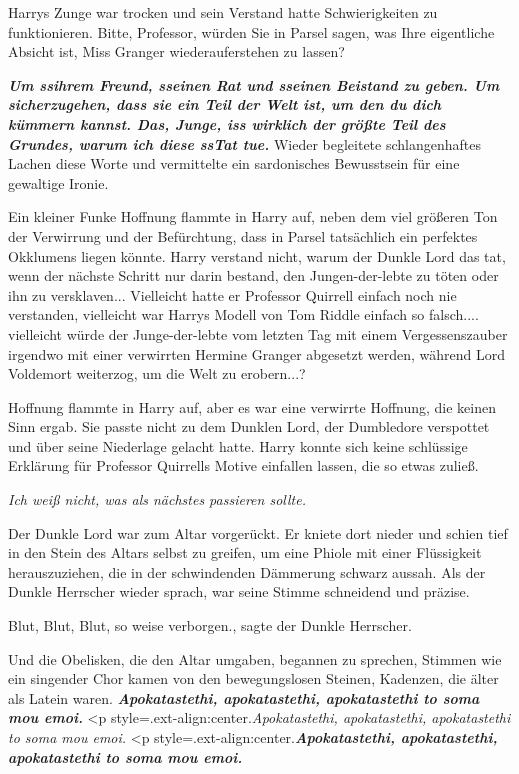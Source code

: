 Harrys Zunge war trocken und sein Verstand hatte Schwierigkeiten zu
funktionieren. \glqq{}Bitte, Professor, würden Sie in Parsel sagen, was Ihre
eigentliche Absicht ist, Miss Granger wiederauferstehen zu lassen?\grqq{}

\glqq{}\textbf{\emph{Um ssihrem Freund, sseinen Rat und sseinen Beistand zu
geben. Um sicherzugehen, dass sie ein Teil der Welt ist, um den du dich kümmern
kannst. Das, Junge, iss wirklich der größte Teil des Grundes, warum ich diese
ssTat tue.}}\grqq{} Wieder begleitete schlangenhaftes Lachen diese Worte und
vermittelte ein sardonisches Bewusstsein für eine gewaltige Ironie.

Ein kleiner Funke Hoffnung flammte in Harry auf, neben dem viel größeren Ton der
Verwirrung und der Befürchtung, dass in Parsel tatsächlich ein perfektes
Okklumens liegen könnte. Harry verstand nicht, warum der Dunkle Lord das tat,
wenn der nächste Schritt nur darin bestand, den Jungen-der-lebte zu töten oder
ihn zu versklaven... Vielleicht hatte er Professor Quirrell einfach noch nie
verstanden, vielleicht war Harrys Modell von Tom Riddle einfach so falsch....
vielleicht würde der Junge-der-lebte vom letzten Tag mit einem Vergessenszauber
irgendwo mit einer verwirrten Hermine Granger abgesetzt werden, während Lord
Voldemort weiterzog, um die Welt zu erobern...?

Hoffnung flammte in Harry auf, aber es war eine verwirrte Hoffnung, die keinen
Sinn ergab. Sie passte nicht zu dem Dunklen Lord, der Dumbledore verspottet und
über seine Niederlage gelacht hatte. Harry konnte sich keine schlüssige
Erklärung für Professor Quirrells Motive einfallen lassen, die so etwas zuließ.

\emph{Ich weiß nicht, was als nächstes passieren sollte.}

Der Dunkle Lord war zum Altar vorgerückt. Er kniete dort nieder und schien tief
in den Stein des Altars selbst zu greifen, um eine Phiole mit einer Flüssigkeit
herauszuziehen, die in der schwindenden Dämmerung schwarz aussah. Als der Dunkle
Herrscher wieder sprach, war seine Stimme schneidend und präzise.

\glqq{}Blut, Blut, Blut, so weise verborgen.\grqq{}, sagte der Dunkle Herrscher.

Und die Obelisken, die den Altar umgaben, begannen zu sprechen, Stimmen wie ein
singender Chor kamen von den bewegungslosen Steinen, Kadenzen, die älter als
Latein waren.  \textbf{\emph{
Apokatastethi, apokatastethi, apokatastethi to soma mou emoi.} }  <p
style=\grqq{}.ext-align:center\grqq{}.\emph{Apokatastethi, apokatastethi,
apokatastethi to soma mou emoi.}   <p
style=\grqq{}.ext-align:center\grqq{}.\textbf{\emph{Apokatastethi,
apokatastethi, apokatastethi to soma mou emoi.} }

